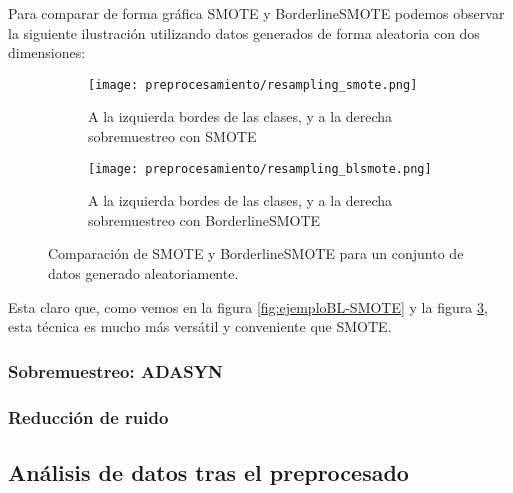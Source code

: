 Para comparar de forma gráfica SMOTE y BorderlineSMOTE podemos observar la siguiente ilustración utilizando datos generados de forma aleatoria con dos dimensiones:

\begin{figure}[H]
    \centering
	 \begin{subfigure}[b]{\textwidth}
		 \centering
		 \texttt{[image: preprocesamiento/resampling\_smote.png]}
		 \caption{A la izquierda bordes de las clases, y a la derecha sobremuestreo con SMOTE}
		 \label{fig:SMOTE-cmp}
	 \end{subfigure}

    \begin{subfigure}[b]{\textwidth}
		 \centering
		  \texttt{[image: preprocesamiento/resampling\_blsmote.png]}
        \caption{A la izquierda bordes de las clases, y a la derecha sobremuestreo con BorderlineSMOTE}
        \label{fig:BLSMOTE-cmp}
    \end{subfigure}

    \caption{Comparación de SMOTE y BorderlineSMOTE para un conjunto de datos generado aleatoriamente.}\label{fig:BLSMOTE-SMOTE}

\end{figure}

Esta claro que, como vemos en la figura \ref{fig:ejemploBL-SMOTE} y la figura \ref{fig:BLSMOTE-SMOTE}, esta técnica es mucho más versátil y conveniente que SMOTE.


\subsubsection{Sobremuestreo: ADASYN}


\subsubsection{Reducción de ruido}



\subsection{Análisis de datos tras el preprocesado}



\newpage
